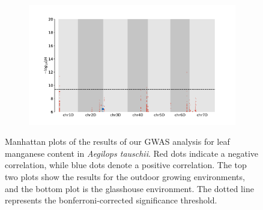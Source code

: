 \documentclass[12pt, letterpaper, ]{report}
\begin{document}
\begin{figure}[h]
\begin{subfigure}[b]{\textwidth}
                \label{Fig:sc_mn_peak}
        \end{subfigure}
        \begin{subfigure}[b]{\textwidth}
                \centering
                \includegraphics[scale=0.3]{images/gwas_plots/svgtopng/gh_mn_plot.png}
                \label{Fig:gh_mn_peak}
        \end{subfigure}
        \caption{Manhattan plots of the results of our GWAS analysis for leaf manganese content in \textit{Aegilops tauschii}. Red dots indicate a negative correlation, while blue dots denote a positive correlation. The top two plots show the results for the outdoor growing environments, and the bottom plot is the glasshouse environment. The dotted line represents the bonferroni-corrected significance threshold.}
        \label{Fig:mn_peak_plot}
\end{figure}



\clearpage
\end{document}
